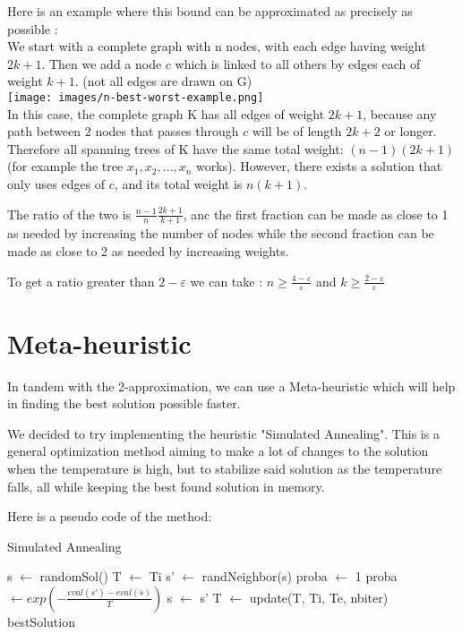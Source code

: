 \documentclass{article}
\begin{document}
Here is an example where this bound can be approximated as precisely as possible :\\

We start with a complete graph with n nodes, with each edge having weight $2k+1$. Then we add a node $c$ which is linked to all others by edges each of weight $k+1$.
(not all edges are drawn on G)\\
\texttt{[image: images/n-best-worst-example.png]}\\

In this case, the complete graph K has all edges of weight $2k+1$, because any path between 2 nodes that passes through $c$ will be of length $2k+2$ or longer.
Therefore all spanning trees of K have the same total weight: $(n-1)(2k+1)$ (for example the tree $x_1, x_2,...,x_n$ works). However, there exists a solution that only uses edges of $c$, and its total weight is $n(k+1)$.

The ratio of the two is $\frac{n-1}{n}\frac{2k+1}{k+1}$, anc the first fraction can be made as close to 1 as needed by increasing the number of nodes while the second fraction can be made as close to 2 as needed by increasing weights.

To get a ratio greater than $2-\varepsilon$ we can take : $n \geq \frac{4 - \varepsilon}{\varepsilon}$ and $k \geq \frac{2 - \varepsilon}{\varepsilon}$
\newpage
\section{Meta-heuristic}
In tandem with the 2-approximation, we can use a Meta-heuristic which will help in finding the best solution possible faster.

We decided to try implementing the heuristic "Simulated Annealing". This is a general optimization method aiming to make a lot of changes to the solution when the temperature is high, but to stabilize said solution as the temperature falls, all while keeping the best found solution in memory.

Here is a pseudo code of the method:

\begin{algorithm}
\caption{Simulated Annealing}
\begin{algorithmic}
    \State s $\gets$ randomSol()
    \State T $\gets$ Ti
        \State s' $\gets$ randNeighbor(s)
            \State proba $\gets$ 1
        \Else 
            \State proba $\gets exp(-\frac{eval(s') - eval(s)}{T})$
        \EndIf
            \State s $\gets$ s'
        \EndIf 
        \State T $\gets$ update(T, Ti, Te, nbiter)
    \EndFor
    \Return bestSolution
    \EndFunction
\end{algorithmic}
\end{algorithm}
\end{document}
